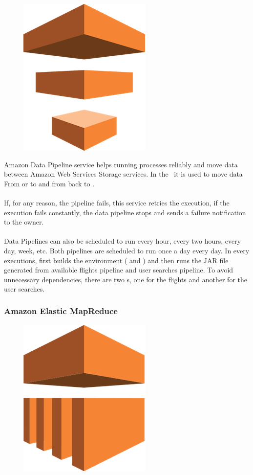 \begin{figure}[H]
\includegraphics[scale=0.1]{resources/data_pipeline-logo.png}
\end{figure}

Amazon Data Pipeline\cite{data_pipeline} service helps running processes reliably and move data between Amazon Web Services Storage services. In the \thesis\ it is used to move data From  or  to  and from  back to .
\\\\
If, for any reason, the pipeline fails, this service retries the execution, if the execution fails constantly, the data pipeline stops and sends a failure notification to the owner.
\\\\
Data Pipelines can also be scheduled to run every hour, every two hours, every day, week, etc. Both pipelines are scheduled to run once a day every day. In every executions, first builds the environment ( and ) and then runs the JAR\cite{jar} file generated from available flights pipeline and user searches pipeline. To avoid unnecessary dependencies, there are two s, one for the flights and another for the user searches.

\subsubsection{Amazon Elastic MapReduce} \label{emr}

\begin{figure}[H]
\includegraphics[scale=0.1]{resources/emr-logo.png}
\end{figure}

